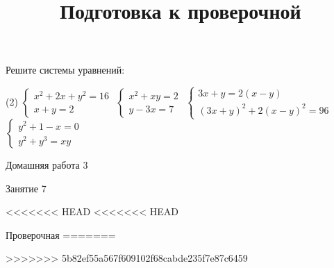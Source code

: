 \begin{class}[number=6]
	\begin{listofex}
		\item {}
		\item Решите системы уравнений:
		\begin{tasks}(2)
			\task \( \left\{
			\begin{array}{l}
				x^2+2x+y^2=16\\
				x+y=2
			\end{array}
			\right. \)
			\task \( \left\{
			\begin{array}{l}
				x^2+xy=2\\
				y-3x=7
			\end{array}
			\right. \)
			\task \( \left\{
			\begin{array}{l}
				3x+y=2(x-y)\\
				(3x+y)^2+2(x-y)^2=96
			\end{array}
			\right. \)
			\task \( \left\{
			\begin{array}{l}
				y^2+1-x=0\\
				y^2+y^3=xy
			\end{array}
			\right. \)
		\end{tasks}
	\end{listofex}
\end{class}

\begin{homework}[number=3]
	\begin{listofex}
		\item Домашняя работа 3
	\end{listofex}
\end{homework}

\begin{class}[number=7]
	\title{Подготовка к проверочной}
	\begin{listofex}
		\item Занятие 7
	\end{listofex}
\end{class}

\begin{exam}
	\begin{listofex}
<<<<<<< HEAD
<<<<<<< HEAD
		\item Проверочная
=======
		\item 
>>>>>>> 5b82ef55a567f609102f68cabde235f7e87c6459
	\end{listofex}
\end{exam}

